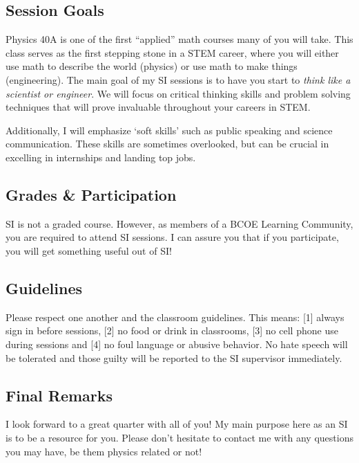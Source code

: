 \documentclass[11pt]{article}
\begin{document}
\subsection*{Session Goals}
Physics 40A is one of the first ``applied'' math courses many of you will take. This class serves as the first stepping stone in a STEM career, where you will either use math to describe the world (physics) or use math to make things (engineering).
The main goal of my SI sessions is to have you start to \emph{think like a scientist or engineer}. We will focus on critical thinking skills and problem solving techniques that will prove invaluable throughout your careers in STEM.

Additionally, I will emphasize `soft skills' such as public speaking and science communication. These skills are sometimes overlooked, but can be crucial in excelling in internships and landing top jobs.

\subsection*{Grades \& Participation}

SI is not a graded course. However, as members of a \textsc{BCOE} Learning Community, you are required to attend SI sessions. I can assure you that if you participate, you will get something useful out of SI!

\subsection*{Guidelines}

Please respect one another and the classroom guidelines.  
This means: [1] always sign in before sessions, [2] no food or drink in classrooms, [3] no cell phone use during sessions and [4] no foul language or abusive behavior.
No hate speech will be tolerated and those guilty will be reported to the SI supervisor immediately. 

\subsection*{Final Remarks}

I look forward to a great quarter with all of you! My main purpose here as an SI is to be a resource for you. Please don't hesitate to contact me with any questions you may have, be them physics related or not!
\end{document}

